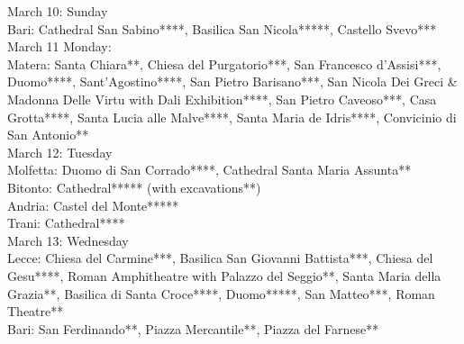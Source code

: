 March 10: Sunday\\
Bari: Cathedral San Sabino****, Basilica San Nicola*****,  Castello Svevo***\\

March 11 Monday:\\
Matera: Santa Chiara**, Chiesa del Purgatorio***, San Francesco d'Assisi***, Duomo****, Sant'Agostino****, San Pietro Barisano***, San Nicola Dei Greci \& Madonna Delle Virtu with Dali Exhibition****, San Pietro Caveoso***, Casa Grotta****, Santa Lucia alle Malve****, Santa Maria de Idris****, Convicinio di San Antonio**\\

March 12: Tuesday\\
Molfetta: Duomo di San Corrado****, Cathedral Santa Maria Assunta**\\
Bitonto: Cathedral***** (with excavations**)\\
Andria: Castel del Monte*****\\
Trani: Cathedral****\\

March 13: Wednesday\\
Lecce: Chiesa del Carmine***, Basilica San Giovanni Battista***, Chiesa del Gesu****, Roman Amphitheatre with Palazzo del Seggio**, Santa Maria della Grazia**, Basilica di Santa Croce****, Duomo*****, San Matteo***, Roman Theatre**\\
Bari: San Ferdinando**, Piazza Mercantile**, Piazza del Farnese**\\

